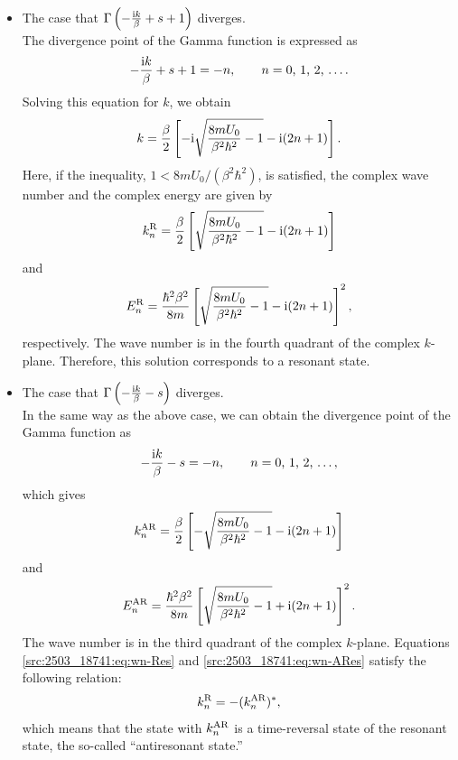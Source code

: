 \begin{itemize}
 \item The case that $\Gamma\left(-\frac{\mathrm{i} k}{\beta}+s+1\right)$ diverges.\\
  The divergence point of the Gamma function is expressed as
  \begin{align}
    -\frac{\mathrm{i} k}{\beta}+s+1=-n, \qquad \text{$n=0$, $1$, $2$, \dots} .
  \end{align}
  Solving this equation for $k$, we obtain
  \begin{align}
    k=\frac{\beta}{2}
    \left[-\mathrm{i} \sqrt{\frac{8mU_{0}}{\beta^2 \hbar^2}-1}-\mathrm{i} (2n+1)\right] .
  \end{align}
  Here, if the inequality, $1<8mU_{0}/(\beta^2 \hbar^2)$, is satisfied, the complex wave number and the complex energy are given by 
  \begin{align}
  \label{src:2503_18741:eq:wn-Res}
    k^{\mathrm{R}}_{n}=\frac{\beta}{2}
    \left[\sqrt{\frac{8mU_{0}}{\beta^2 \hbar^2}-1}-\mathrm{i} (2n+1)\right] 
  \end{align}
  and
  \begin{align}
    E^{\mathrm{R}}_{n}=\frac{\hbar^2 \beta^2}{8m}
    \left[\sqrt{\frac{8mU_{0}}{\beta^2 \hbar^2}-1}-\mathrm{i} (2n+1)\right]^2,
  \end{align}
  respectively. The wave number is in the fourth quadrant of the complex $k$-plane. Therefore, this solution corresponds to a resonant state.  \\
 \item The case that $\Gamma\left(-\frac{\mathrm{i} k}{\beta}-s\right)$ diverges.\\
  In the same way as the above case, we can obtain the divergence point of the Gamma function as
  \begin{align}
    -\frac{\mathrm{i} k}{\beta}-s=-n, \qquad \text{$n=0$, $1$, $2$, \dots},
  \end{align}
  which gives 
  \begin{align}
   \label{src:2503_18741:eq:wn-ARes}
    k^{\mathrm{AR}}_{n}=\frac{\beta}{2}
    \left[-\sqrt{\frac{8mU_{0}}{\beta^2 \hbar^2}-1}-\mathrm{i} (2n+1)\right]
  \end{align}
  and 
  \begin{align}
    E^{\mathrm{AR}}_{n}=\frac{\hbar^2 \beta^2}{8m}
    \left[\sqrt{\frac{8mU_{0}}{\beta^2 \hbar^2}-1}+\mathrm{i} (2n+1)\right]^2 .
  \end{align}
  The wave number is in the third quadrant of the complex $k$-plane. Equations \eqref{src:2503_18741:eq:wn-Res} and \eqref{src:2503_18741:eq:wn-ARes} satisfy the following relation:
  \begin{align}
    k^{\mathrm{R}}_{n} = - (k^{\mathrm{AR}}_{n})^{*},
  \end{align}
  which means that the state with $k^{\mathrm{AR}}_{n}$ is a time-reversal state of the resonant state, the so-called ``antiresonant state.''
\end{itemize}
